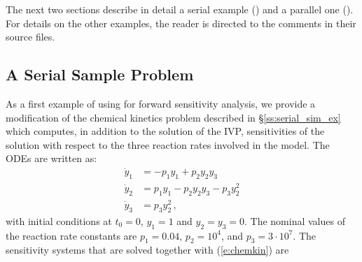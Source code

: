 The next two sections describe in detail a serial example () and
a parallel one (). For details on the other examples, the reader is
directed to the comments in their source files.

\subsection{A Serial Sample Problem}\label{ss:serial_fwd_ex}

As a first example of using {\cvodes} for forward sensitivity analysis,
we provide a modification of the chemical kinetics problem described in
\S\ref{ss:serial_sim_ex} which computes, in addition to the solution of the
IVP, sensitivities of the solution with respect to the three reaction rates 
involved in the model.
The ODEs are written as:
\begin{equation}\label{e:chemkin}
  \begin{split}
    {\dot y}_1 &= -p_1 y_1 + p_2 y_2 y_3   \\
    {\dot y}_2 &=  p_1 y_1 - p_2 y_2 y_3 - p_3 y_2^2 \\
    {\dot y}_3 &=  p_3 y_2^2 \, ,
  \end{split}
\end{equation}
with initial conditions at $t_0 = 0$, $y_1 = 1$ and $y_2 = y_3 = 0$. 
The nominal values of the reaction rate constants are 
$p_1 = 0.04$, $p_2 = 10^4$, and $p_3 = 3\cdot 10^7$.
The sensitivity systems that are solved together with (\ref{e:chemkin}) are
